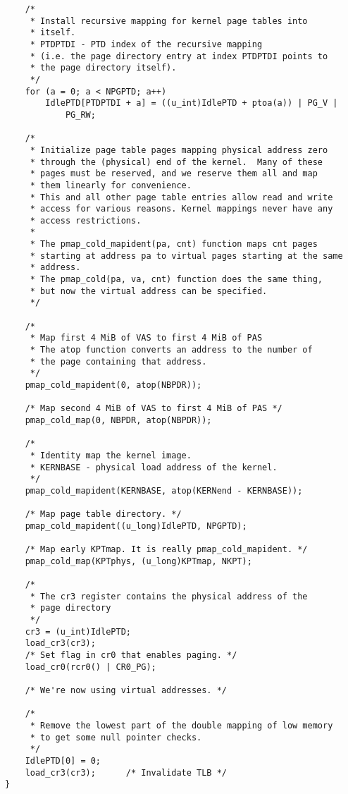 \documentclass[shortabstract, english]{iithesis}
\newenvironment{code}{}{}
\begin{document}
\begin{code}
\begin{verbatim}
    /*
     * Install recursive mapping for kernel page tables into
     * itself.
     * PTDPTDI - PTD index of the recursive mapping
     * (i.e. the page directory entry at index PTDPTDI points to
     * the page directory itself).
     */
    for (a = 0; a < NPGPTD; a++)
        IdlePTD[PTDPTDI + a] = ((u_int)IdlePTD + ptoa(a)) | PG_V |
            PG_RW;

    /*
     * Initialize page table pages mapping physical address zero
     * through the (physical) end of the kernel.  Many of these
     * pages must be reserved, and we reserve them all and map
     * them linearly for convenience.
     * This and all other page table entries allow read and write
     * access for various reasons. Kernel mappings never have any
     * access restrictions.
     *
     * The pmap_cold_mapident(pa, cnt) function maps cnt pages
     * starting at address pa to virtual pages starting at the same
     * address.
     * The pmap_cold(pa, va, cnt) function does the same thing,
     * but now the virtual address can be specified.
     */

    /*
     * Map first 4 MiB of VAS to first 4 MiB of PAS
     * The atop function converts an address to the number of
     * the page containing that address.
     */
    pmap_cold_mapident(0, atop(NBPDR));

    /* Map second 4 MiB of VAS to first 4 MiB of PAS */
    pmap_cold_map(0, NBPDR, atop(NBPDR));

    /*
     * Identity map the kernel image.
     * KERNBASE - physical load address of the kernel.
     */
    pmap_cold_mapident(KERNBASE, atop(KERNend - KERNBASE));

    /* Map page table directory. */
    pmap_cold_mapident((u_long)IdlePTD, NPGPTD);

    /* Map early KPTmap. It is really pmap_cold_mapident. */
    pmap_cold_map(KPTphys, (u_long)KPTmap, NKPT);

    /*
     * The cr3 register contains the physical address of the
     * page directory
     */
    cr3 = (u_int)IdlePTD;
    load_cr3(cr3);
    /* Set flag in cr0 that enables paging. */
    load_cr0(rcr0() | CR0_PG);

    /* We're now using virtual addresses. */

    /*
     * Remove the lowest part of the double mapping of low memory
     * to get some null pointer checks.
     */
    IdlePTD[0] = 0;
    load_cr3(cr3);      /* Invalidate TLB */
}
\end{verbatim}
\end{code}
\end{document}
